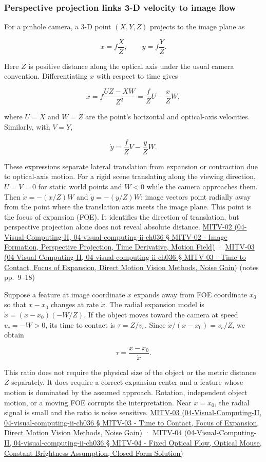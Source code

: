 \subsubsection{Perspective projection links 3-D velocity to image flow}\label{perspective-projection-links-3-d-velocity-to-image-flow}

For a pinhole camera, a 3-D point \((X,Y,Z)\) projects to the image plane as

\[
x=f\frac{X}{Z},\qquad y=f\frac{Y}{Z}.
\]

Here \(Z\) is positive distance along the optical axis under the usual camera convention. Differentiating \(x\) with respect to time gives

\[
\dot{x}=f\frac{U Z-XW}{Z^2}=\frac{f}{Z}U-\frac{x}{Z}W,
\]

where \(U=\dot X\) and \(W=\dot Z\) are the point's horizontal and optical-axis velocities. Similarly, with \(V=\dot Y\),

\[
\dot{y}=\frac{f}{Z}V-\frac{y}{Z}W.
\]

These expressions separate lateral translation from expansion or contraction due to optical-axis motion. For a rigid scene translating along the viewing direction, \(U=V=0\) for static world points and \(W<0\) while the camera approaches them. Then \(\dot{x}=-(x/Z)W\) and \(\dot{y}=-(y/Z)W\): image vectors point radially away from the point where the translation axis meets the image plane. This point is the focus of expansion (FOE). It identifies the direction of translation, but perspective projection alone does not reveal absolute distance. \href{}{MITV-02 (04-Visual-Computing-II, 04-visual-computing-ii-ch036 § MITV-02 - Image Formation, Perspective Projection, Time Derivative, Motion Field)} · \href{}{MITV-03 (04-Visual-Computing-II, 04-visual-computing-ii-ch036 § MITV-03 - Time to Contact, Focus of Expansion, Direct Motion Vision Methods, Noise Gain)} (notes pp.~9--18)

Suppose a feature at image coordinate \(x\) expands away from FOE coordinate \(x_0\) so that \(x-x_0\) changes at rate \(\dot{x}\). The radial expansion model is \(\dot{x}=(x-x_0)(-W/Z)\). If the object moves toward the camera at speed \(v_c=-W>0\), its time to contact is \(\tau=Z/v_c\). Since \(\dot{x}/(x-x_0)=v_c/Z\), we obtain

\[
\tau=\frac{x-x_0}{\dot{x}}.
\]

This ratio does not require the physical size of the object or the metric distance \(Z\) separately. It does require a correct expansion center and a feature whose motion is dominated by the assumed approach. Rotation, independent object motion, or a moving FOE corrupts the interpretation. Near \(x=x_0\), the radial signal is small and the ratio is noise sensitive. \href{}{MITV-03 (04-Visual-Computing-II, 04-visual-computing-ii-ch036 § MITV-03 - Time to Contact, Focus of Expansion, Direct Motion Vision Methods, Noise Gain)} · \href{}{MITV-04 (04-Visual-Computing-II, 04-visual-computing-ii-ch036 § MITV-04 - Fixed Optical Flow, Optical Mouse, Constant Brightness Assumption, Closed Form Solution)}

